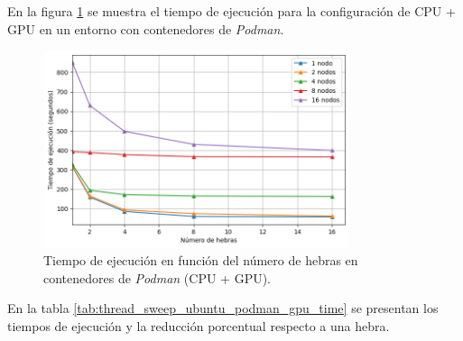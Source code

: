 En la figura \ref{fig:thread_sweep_ubuntu_podman_gpu_time} se muestra el tiempo de ejecución para la configuración de CPU + GPU en un entorno con contenedores de \textit{Podman}.

\begin{figure}[ht]
    \centering
    \includegraphics[width=0.8\textwidth]{imagenes/cap5/thread_sweep_ubuntu_podman_gpu_time.png}
    \caption{Tiempo de ejecución en función del número de hebras en contenedores de \textit{Podman} (CPU + GPU).}
    \label{fig:thread_sweep_ubuntu_podman_gpu_time}
\end{figure}

En la tabla \ref{tab:thread_sweep_ubuntu_podman_gpu_time} se presentan los tiempos de ejecución y la reducción porcentual respecto a una hebra.

